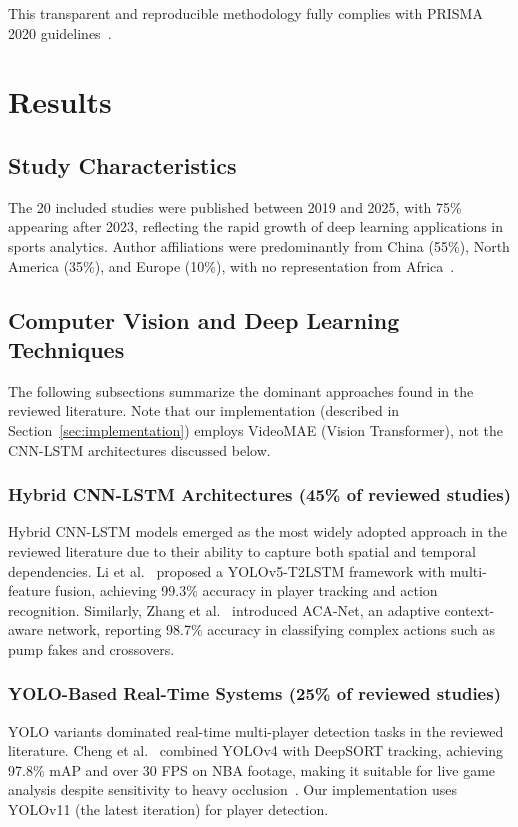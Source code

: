 \documentclass[conference]{IEEEtran}
\begin{document}
This transparent and reproducible methodology fully complies with PRISMA 2020 guidelines~\cite{prisma2020}.


\section{Results}

\subsection{Study Characteristics}
The 20 included studies were published between 2019 and 2025, with 75\% appearing after 2023, reflecting the rapid growth of deep learning applications in sports analytics. Author affiliations were predominantly from China (55\%), North America (35\%), and Europe (10\%), with no representation from Africa~\cite{li2021application,yan2023review,li2025defensive,nagorna2025tactical}.

\subsection{Computer Vision and Deep Learning Techniques}

The following subsections summarize the dominant approaches found in the reviewed literature. Note that our implementation (described in Section~\ref{sec:implementation}) employs VideoMAE (Vision Transformer), not the CNN-LSTM architectures discussed below.

\subsubsection{Hybrid CNN-LSTM Architectures (45\% of reviewed studies)}
Hybrid CNN-LSTM models emerged as the most widely adopted approach in the reviewed literature due to their ability to capture both spatial and temporal dependencies. Li et al.~\cite{li2023yolo} proposed a YOLOv5-T2LSTM framework with multi-feature fusion, achieving 99.3\% accuracy in player tracking and action recognition. Similarly, Zhang et al.~\cite{zhang2024acahet} introduced ACA-Net, an adaptive context-aware network, reporting 98.7\% accuracy in classifying complex actions such as pump fakes and crossovers.

\subsubsection{YOLO-Based Real-Time Systems (25\% of reviewed studies)}
YOLO variants dominated real-time multi-player detection tasks in the reviewed literature. Cheng et al.~\cite{cheng2022ann} combined YOLOv4 with DeepSORT tracking, achieving 97.8\% mAP and over 30 FPS on NBA footage, making it suitable for live game analysis despite sensitivity to heavy occlusion~\cite{tian2019strategies,su2022score}. Our implementation uses YOLOv11 (the latest iteration) for player detection.
\end{document}
